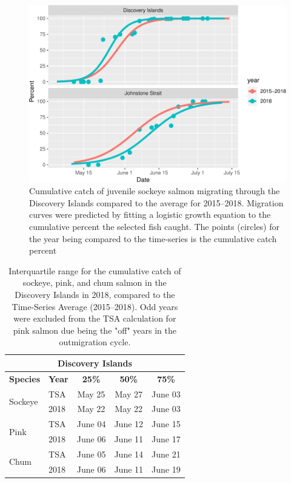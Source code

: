 \documentclass[fleqn,10pt]{wlpeerj} %
\begin{document}
\begin{figure}
\includegraphics[width=0.8\linewidth]{peer_j_migration_dynamics_files/figure-latex/mt-1} \caption{Cumulative catch of juvenile sockeye salmon migrating through the Discovery Islands compared to the average for 2015--2018. Migration curves were predicted by fitting a logistic growth equation to the cumulative percent the selected fish caught. The points (circles) for the year being compared to the time-series is the cumulative catch percent}\label{fig:mt}
\end{figure}

\begin{table}[ht]
\centering
\begin{tabular}{l|l||c|c|c}
\multicolumn{5}{c}{\textbf{Discovery Islands}} \\
\hline
\textbf{Species} & \textbf{Year} & \textbf{25\%} & \textbf{50\%} & \textbf{75\%} \\
\hline
\multirow{2}{*}{Sockeye} & TSA & May 25 & May 27 & June 03 \\
& 2018 & May 22 & May 22 & June 03 \\
\hline
\multirow{2}{*}{Pink} & TSA & June 04 & June 12 & June 15 \\
& 2018 & June 06 & June 11 & June 17 \\
\hline
\multirow{2}{*}{Chum} & TSA & June 05 & June 14 & June 21 \\
& 2018 & June 06 & June 11 & June 19 \\
\end{tabular}
\caption{\label{tab:mt_di}Interquartile range for the cumulative catch of sockeye, pink, and chum salmon in the Discovery Islands in 2018, compared to the Time-Series Average (2015--2018). Odd years were excluded from the TSA calculation for pink salmon due being the "off" years in the outmigration cycle.}
\end{table}
\end{document}
